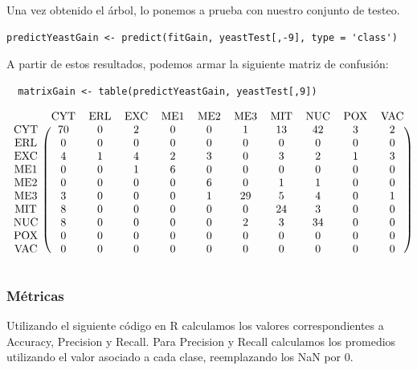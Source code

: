 \documentclass[11pt]{article}
\begin{document}
Una vez obtenido el árbol, lo ponemos a prueba con nuestro conjunto de testeo.

\begin{verbatim}
predictYeastGain <- predict(fitGain, yeastTest[,-9], type = 'class')
\end{verbatim}

A partir de estos resultados, podemos armar la siguiente matriz de confusión:
\begin{verbatim}
  matrixGain <- table(predictYeastGain, yeastTest[,9])
\end{verbatim}

\begin{equation*}
  \begin{blockarray}{ccccccccccc}
     & \text{CYT} &  \text{ERL} & \text{EXC} & \text{ME1} & \text{ME2} & \text{ME3} & \text{MIT} & \text{NUC} & \text{POX} & \text{VAC} \\
    \begin{block}{c(cccccccccc)} 
      \text{CYT} & 70 & 0 & 2 & 0 & 0 &  1 & 13 & 42 &  3 & 2 \\
      \text{ERL} &  0 & 0 & 0 & 0 & 0 &  0 &  0 &  0 &  0 & 0 \\
      \text{EXC} &  4 & 1 & 4 & 2 & 3 &  0 &  3 &  2 &  1 & 3 \\
      \text{ME1} &  0 & 0 & 1 & 6 & 0 &  0 &  0 &  0 &  0 & 0 \\
      \text{ME2} &  0 & 0 & 0 & 0 & 6 &  0 &  1 &  1 &  0 & 0 \\
      \text{ME3} &  3 & 0 & 0 & 0 & 1 & 29 &  5 &  4 &  0 & 1 \\
      \text{MIT} &  8 & 0 & 0 & 0 & 0 &  0 & 24 &  3 &  0 & 0 \\
      \text{NUC} &  8 & 0 & 0 & 0 & 0 &  2 &  3 & 34 &  0 & 0 \\
      \text{POX} &  0 & 0 & 0 & 0 & 0 &  0 &  0 &  0 &  0 & 0 \\
      \text{VAC} &  0 & 0 & 0 & 0 & 0 &  0 &  0 &  0 &  0 & 0 \\
    \end{block}
  \end{blockarray}
\end{equation*}

\subsubsection*{Métricas}

Utilizando el siguiente código en R calculamos los valores correspondientes a 
Accuracy, Precision y Recall. Para Precision y Recall calculamos los promedios utilizando
el valor asociado a cada clase, reemplazando los NaN por 0.
\end{document}
